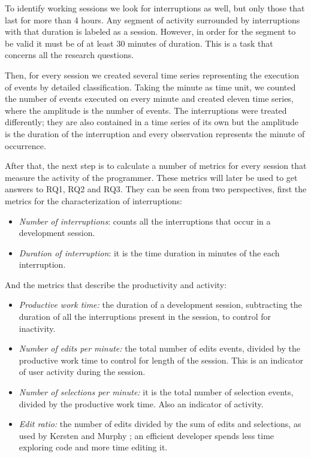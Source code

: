 To identify working sessions we look for interruptions as well, but only those that last for more than 4 hours. Any segment of activity surrounded by interruptions with that duration is labeled as a session. However, in order for the segment to be valid it must be of at least 30 minutes of duration. This is a task that concerns all the research questions.

Then, for every session we created several time series representing the execution of events by detailed classification. Taking the minute as time unit, we counted the number of events executed on every minute and created eleven time series, where the amplitude is the number of events. The interruptions were treated differently; they are also contained in a time series of its own but the amplitude is the duration of the interruption and every observation represents the minute of occurrence. 

After that, the next step is to calculate a number of metrics for every session that measure the activity of the programmer. These metrics will later be used to get answers to RQ1, RQ2 and RQ3. They can be seen from two perspectives, first the metrics for the characterization of interruptions:
\begin{itemize}
	\item \textit{Number of interruptions}:  counts all the interruptions that occur in a development session.
	\item \textit{Duration of interruption}:  it is the time duration in minutes of the each interruption. 
\end{itemize}

And the metrics that describe the productivity and activity:
\begin{itemize}
	\item \textit{Productive work time:} the duration of a development session, subtracting the duration of all the interruptions present in the session, to control for inactivity.
	\item \textit{Number of edits per minute:} the total number of edits events, divided by the productive work time to control for length of the session. This is an indicator of user activity during the session.
	\item \textit{Number of selections per minute:} it is the total number of selection events, divided by the productive work time. Also an indicator of activity.
	\item \textit{Edit ratio:} the number of edits divided by the sum of edits and selections, as used by Kersten and Murphy \cite{KM06}; an efficient developer spends less time exploring code and more time editing it.
\end{itemize} 

